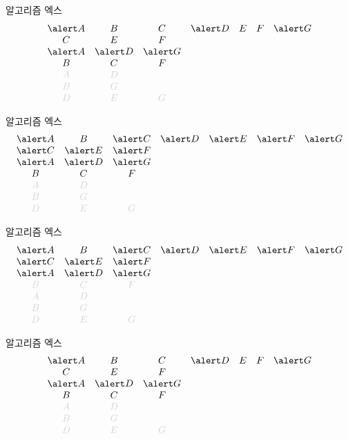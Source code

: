 \documentclass[xcolor=svgnames]{beamer}
\let\a\alert
\def\g{\color{LightGray}}
\begin{document}
%
\begin{frame}{알고리즘 엑스}
\Large\boldmath
  $$
  \begin{array}{ccccccc}
    \a A & B & C & \a D & E & F & \a G\\
    C & E & F &&&&\\
    \a A & \a D & \a G &&&&\\
    B & C & F &&&&\\
    \g A & \g D &&&&&\\
    \g B & \g G &&&&&\\
    \g D & \g E & \g G &&&&
  \end{array}
  $$
\end{frame}

%
\begin{frame}{알고리즘 엑스}
\Large\boldmath
  $$
  \begin{array}{ccccccc}
    \a A & B & \a C & \a D & \a E & \a F & \a G\\
    \a C & \a E & \a F &&&&\\
    \a A & \a D & \a G &&&&\\
    B & C & F &&&&\\
    \g A & \g D &&&&&\\
    \g B & \g G &&&&&\\
    \g D & \g E & \g G &&&&
  \end{array}
  $$
\end{frame}

%
\begin{frame}{알고리즘 엑스}
  \Large\boldmath
  $$
  \begin{array}{ccccccc}
    \a A & B & \a C & \a D & \a E & \a F & \a G\\
    \a C & \a E & \a F &&&&\\
    \a A & \a D & \a G &&&&\\
    \g B & \g C & \g F &&&&\\
    \g A & \g D &&&&&\\
    \g B & \g G &&&&&\\
    \g D & \g E & \g G &&&&
  \end{array}
  $$
\end{frame}

%
\begin{frame}{알고리즘 엑스}
\Large\boldmath
  $$
  \begin{array}{ccccccc}
    \a A & B & C & \a D & E & F & \a G\\
    C & E & F &&&&\\
    \a A & \a D & \a G &&&&\\
    B & C & F &&&&\\
    \g A & \g D &&&&&\\
    \g B & \g G &&&&&\\
    \g D & \g E & \g G &&&&
  \end{array}
  $$
\end{frame}
\end{document}
